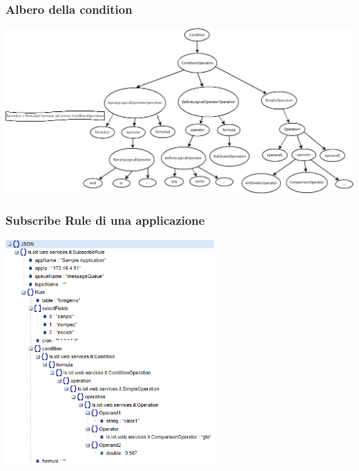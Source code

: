 \documentclass{beamer}
\begin{document}
\begin{frame}
\frametitle{Albero della condition}
\includegraphics[width=1\textwidth]{images/strutturaquerytree.png}
\end{frame}

\begin{frame}
\frametitle{Subscribe Rule di una applicazione}
\includegraphics[width=0.6\textwidth]{images/subscribe-json-1.png}
\end{frame}
\end{document}
